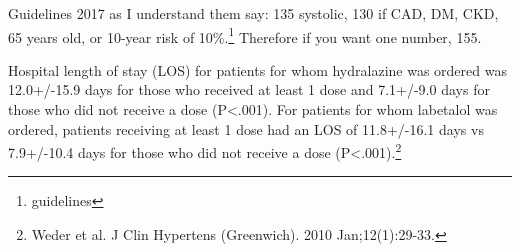 \documentclass{tufte-handout}
\begin{document}
Guidelines 2017 as I understand them say: 135 systolic, 130 if CAD, DM, CKD, 65 years old, or 10-year risk of 10\%.\footnote{guidelines} Therefore if you want one number, 155.

Hospital length of stay (LOS) for patients for whom hydralazine was ordered was 12.0+/-15.9 days for those who received at least 1 dose and 7.1+/-9.0 days for those who did not receive a dose (P<.001). For patients for whom labetalol was ordered, patients receiving at least 1 dose had an LOS of 11.8+/-16.1 days vs 7.9+/-10.4 days for those who did not receive a dose (P<.001).\footnote{Weder et al. J Clin Hypertens (Greenwich). 2010 Jan;12(1):29-33. }
 
\end{document}
